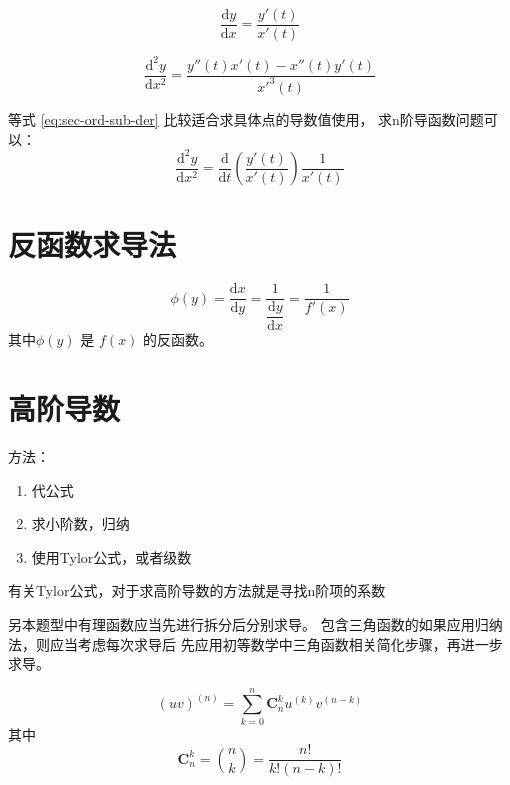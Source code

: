 \begin{lemma}
    \begin{equation}
        \dfrac{\mbox{d}y}{\mbox{d}x} = \dfrac{y'(t)}{x'(t)}
    \end{equation}

    \begin{equation}\label{eq:sec-ord-sub-der}
        \dfrac{\mbox{d}^2 y}{\mbox{d}x^2} = \dfrac{y''(t) x'(t) -x''(t) y'(t)}{x'^3(t)}
    \end{equation}

    等式 \ref{eq:sec-ord-sub-der} 比较适合求具体点的导数值使用，
    求n阶导函数问题可以：
    \begin{equation}
        \dfrac{\mbox{d}^2y}{\mbox{d}x^2} = 
        \dfrac{\mbox{d}}{\mbox{d}t} 
        \left(
            \dfrac{y'(t)}{x'(t)} 
        \right)
        \dfrac{1}{x'(t)}
    \end{equation}
\end{lemma}

\section{反函数求导法}

\begin{lemma}
    \begin{equation}
        \phi (y) = \dfrac{\mbox{d}x}{\mbox{d}y} = \dfrac{1}{\dfrac{\mbox{d}y}{\mbox{d}x}}
                   = \dfrac{1}{f'(x)}
    \end{equation}
    其中$\phi(y)$ 是 $f(x)$ 的反函数。
\end{lemma}

\section{高阶导数}

方法：
\begin{enumerate}
    \item 代公式
    \item 求小阶数，归纳
    \item 使用Tylor公式，或者级数
\end{enumerate}
有关Tylor公式，对于求高阶导数的方法就是寻找n阶项的系数

另本题型中有理函数应当先进行拆分后分别求导。
包含三角函数的如果应用归纳法，则应当考虑每次求导后
先应用初等数学中三角函数相关简化步骤，再进一步求导。

\begin{lemma}
    \begin{equation}\label{eq:uv-n-order-derivitive}
        (uv)^{(n)} = \sum_{k=0}^{n} \mathbf{C}^{k}_{n} u^{(k)} v^{(n-k)}
    \end{equation}
    其中
    \begin{equation*}
        \mathbf{C}^{k}_{n} = \binom{n}{k} = \dfrac{n!}{k!(n-k)!}
    \end{equation*}
\end{lemma}

